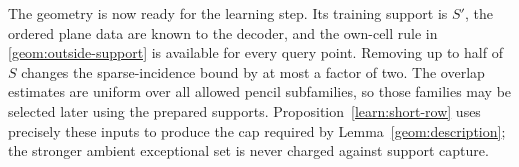The geometry is now ready for the learning step. Its training support
is $S'$, the ordered plane data are known to the decoder, and the
own-cell rule in \eqref{geom:outside-support} is available for every
query point. Removing up to half of $S$ changes the sparse-incidence
bound by at most a factor of two. The overlap estimates are uniform
over all allowed pencil subfamilies, so those families may be selected
later using the prepared supports. Proposition~\ref{learn:short-row}
uses precisely these inputs to produce the cap required by
Lemma~\ref{geom:description}; the stronger ambient exceptional set
is never charged against support capture.

